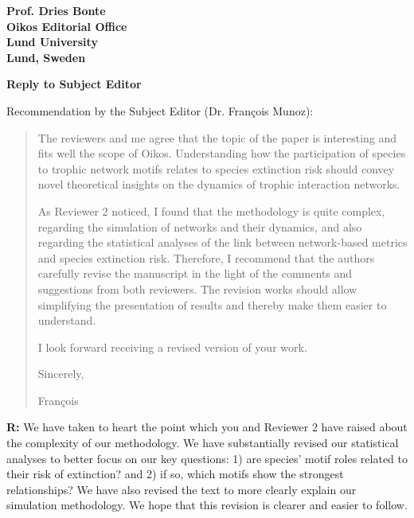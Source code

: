 \documentclass[12pt]{letter}
\begin{document}
\begin{letter}{\bf Prof. Dries Bonte\\
Oikos Editorial Office \\
Lund University \\
Lund, Sweden}













\clearpage

{\large \textbf{Reply to Subject Editor}}

  Recommendation by the Subject Editor (Dr. François Munoz):
    \begin{quotation}    

  The reviewers and me agree that the topic of the paper is interesting and fits well the scope of Oikos.
  Understanding how the participation of species to trophic network motifs relates to species extinction risk should convey novel theoretical insights on the dynamics of trophic interaction networks.

  As Reviewer 2 noticed, I found that the methodology is quite complex, regarding the simulation of networks and their dynamics, and also regarding the statistical analyses of the link between network-based metrics and species extinction risk.
  Therefore, I recommend that the authors carefully revise the manuscript in the light of the comments and suggestions from both reviewers. The revision works should allow simplifying the presentation of results and thereby make them easier to understand.

  I look forward receiving a revised version of your work.

  Sincerely,

  François
  \end{quotation}
  
  \textbf{R:} We have taken to heart the point which you and Reviewer 2 have raised about the complexity of our methodology. We have substantially revised our statistical analyses to better focus on our key questions: 1) are species' motif roles related to their risk of extinction? and 2) if so, which motifs show the strongest relationships? We have also revised the text to more clearly explain our simulation methodology. We hope that this revision is clearer and easier to follow.


\end{letter}
\end{document}
